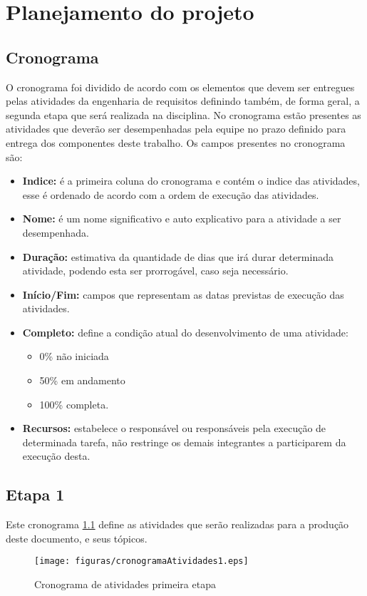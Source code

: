 \chapter[Planejamento do projeto]{Planejamento do projeto}
\section{Cronograma}
O cronograma foi dividido de acordo com os elementos que devem ser entregues pelas atividades da engenharia de requisitos definindo também, de forma geral, a segunda etapa que será realizada na disciplina. No cronograma estão presentes as atividades que deverão ser desempenhadas pela equipe no prazo definido para entrega dos componentes deste trabalho.
Os campos presentes no cronograma são:
\begin{itemize}
    \item \textbf{Indice:} é a primeira coluna do cronograma e contém o indice das atividades, esse é ordenado de acordo com a ordem de execução das atividades.
    \item \textbf{Nome:} é um nome significativo e auto explicativo para a atividade a ser desempenhada. 
    \item \textbf{Duração:} estimativa da quantidade de dias que irá durar determinada atividade, podendo esta ser prorrogável, caso seja necessário.
    \item \textbf{Início/Fim:} campos que representam as datas previstas de execução das atividades.
    \item \textbf{Completo:} define a condição atual do desenvolvimento de uma atividade:
        \begin{itemize}
            \item 0\% não iniciada
            \item  50\% em andamento
            \item 100\% completa.
        \end{itemize}
    \item \textbf{Recursos:} estabelece o responsável ou responsáveis pela execução de determinada tarefa, não restringe os demais integrantes a participarem da execução desta.
\end{itemize}
\section{Etapa 1}
Este cronograma \ref{cronograma1} define as atividades que serão realizadas para a produção deste documento, e seus tópicos.
\begin{figure}[H]
    \centering
    \label{cronograma1}
    \texttt{[image: figuras/cronogramaAtividades1.eps]}
    \caption{Cronograma de atividades primeira etapa}
\end{figure}
